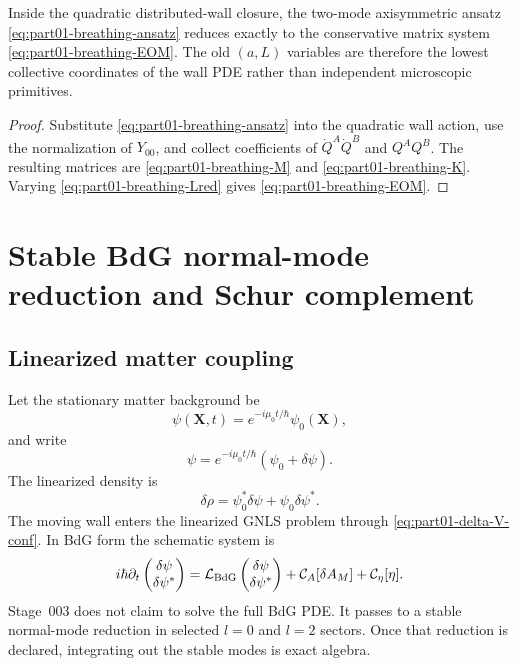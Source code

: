 \begin{theorem}
\label{thm:part01-breathing-reduction}
Inside the quadratic distributed-wall closure, the two-mode axisymmetric ansatz \eqref{eq:part01-breathing-ansatz} reduces exactly to the conservative matrix system \eqref{eq:part01-breathing-EOM}.  The old \((a,L)\) variables are therefore the lowest collective coordinates of the wall PDE rather than independent microscopic primitives.
\end{theorem}

\begin{proof}
Substitute \eqref{eq:part01-breathing-ansatz} into the quadratic wall action, use the normalization of \(Y_{00}\), and collect coefficients of \(\dot Q^A\dot Q^B\) and \(Q^AQ^B\).  The resulting matrices are \eqref{eq:part01-breathing-M} and \eqref{eq:part01-breathing-K}.  Varying \eqref{eq:part01-breathing-Lred} gives \eqref{eq:part01-breathing-EOM}.
\end{proof}

\section{Stable BdG normal-mode reduction and Schur complement}
\label{sec:part01_parent_geometry:stable-bdg-normal-mode-reduction-and-schur-complem}

\subsection{Linearized matter coupling}
\label{subsec:part01-linearized-matter-coupling}

Let the stationary matter background be
\begin{equation}
\psi(\mathbf X,t)=e^{-i\mu_0t/\hbar}\psi_0(\mathbf X),
\end{equation}
and write
\begin{equation}
\psi=e^{-i\mu_0t/\hbar}\left(\psi_0+\delta\psi\right).
\end{equation}
The linearized density is
\begin{equation}
\delta\rho=\psi_0^\ast\delta\psi+\psi_0\delta\psi^\ast.
\end{equation}
The moving wall enters the linearized GNLS problem through \eqref{eq:part01-delta-V-conf}.  In BdG form the schematic system is
\begin{equation}
\label{eq:part01-BdG-schematic}
i\hbar\partial_t
\begin{pmatrix}
\delta\psi\\ \delta\psi^\ast
\end{pmatrix}
=
\mathcal L_{\rm BdG}
\begin{pmatrix}
\delta\psi\\ \delta\psi^\ast
\end{pmatrix}
+\mathcal C_A[\delta A_M]+\mathcal C_\eta[\eta].
\end{equation}
Stage~003 does not claim to solve the full BdG PDE.  It passes to a stable normal-mode reduction in selected \(l=0\) and \(l=2\) sectors.  Once that reduction is declared, integrating out the stable modes is exact algebra.

